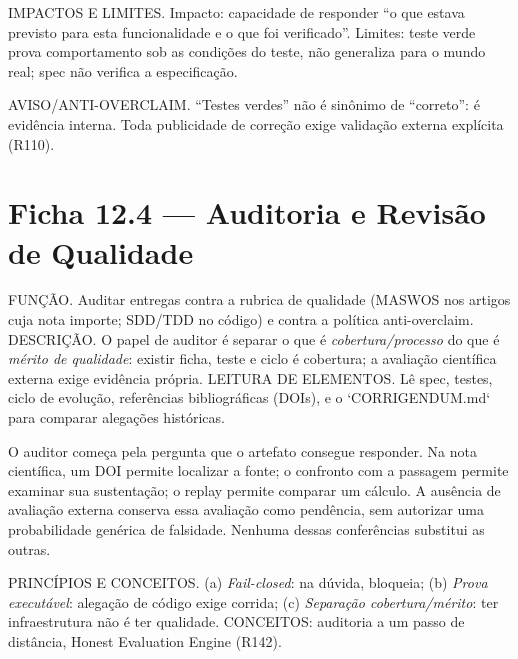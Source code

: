 \begin{limite}
IMPACTOS E LIMITES. Impacto: capacidade de responder ``o que estava previsto
para esta funcionalidade e o que foi verificado''. Limites: teste verde prova
comportamento sob as condições do teste, não generaliza para o mundo real;
spec não verifica a especificação.
\end{limite}

\begin{aviso}
AVISO/ANTI-OVERCLAIM. ``Testes verdes'' não é sinônimo de ``correto'': é
evidência interna. Toda publicidade de correção exige validação externa
explícita (R110).
\end{aviso}

\section{Ficha 12.4 — Auditoria e Revisão de Qualidade}


\begin{descricao}
FUNÇÃO. Auditar entregas contra a rubrica de qualidade (MASWOS nos artigos cuja
nota importe; SDD/TDD no código) e contra a política anti-overclaim. DESCRIÇÃO.
O papel de auditor é separar o que é \emph{cobertura/processo} do que é
\emph{mérito de qualidade}: existir ficha, teste e ciclo é cobertura; a
avaliação científica externa exige evidência própria. LEITURA DE ELEMENTOS. Lê
spec, testes, ciclo de evolução, referências bibliográficas (DOIs), e o
`CORRIGENDUM.md` para comparar alegações históricas.
\end{descricao}

O auditor começa pela pergunta que o artefato consegue responder. Na nota
científica, um DOI permite localizar a fonte; o confronto com a passagem
permite examinar sua sustentação; o replay permite comparar um cálculo.
A ausência de avaliação externa conserva essa avaliação como pendência,
sem autorizar uma probabilidade genérica de falsidade. Nenhuma dessas
conferências substitui as outras.
\begin{conceito}
PRINCÍPIOS E CONCEITOS. (a) \emph{Fail-closed}: na dúvida, bloqueia; (b)
\emph{Prova executável}: alegação de código exige corrida; (c) \emph{Separação
cobertura/mérito}: ter infraestrutura não é ter qualidade. CONCEITOS:
auditoria a um passo de distância, Honest Evaluation Engine (R142).
\end{conceito}

